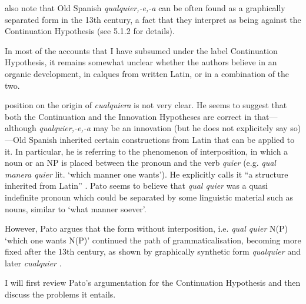 \documentclass[output=paper]{langscibook}
\begin{document}
also note that Old Spanish \textit{qualquier,-e,-a} can be often found as a graphically separated form in the 13th century, a fact that they interpret as being against the Continuation Hypothesis (see 5.1.2 for details). 

  In most of the accounts that I have subsumed under the label Continuation Hypothesis, it remains somewhat unclear whether the authors believe in an organic development, in calques from written Latin, or in a combination of the two.

   position on the origin of \textit{cualquiera} is not very clear. He seems to suggest that both the Continuation and the Innovation Hypotheses are correct in that—although \textit{qualquier,\nobreakdash-e,\nobreakdash-a} may be an innovation (but he does not explicitely say so)—Old Spanish inherited certain constructions from Latin that can be applied to it. In particular, he is referring to the phenomenon of interposition, in which a noun or an NP is placed between the pronoun and the verb \textit{quier} (e.g. \textit{qual manera quier} lit. ‘which manner one wants’). He explicitly calls it “a structure inherited from Latin” \citep[273]{Pato2012}. Pato seems to believe that \textit{qual quier} was a quasi indefinite pronoun which could be separated by some linguistic material such as nouns, similar to ‘what manner soever’.

  However, Pato argues that the form without interposition, i.e. \textit{qual quier} N(P) ‘which one wants N(P)’ continued the path of grammaticalisation, becoming more fixed after the 13th century, as shown by graphically synthetic form \textit{qualquier} and later \textit{cualquier} \citep[297]{Pato2012}.

  I will first review Pato’s argumentation for the Continuation Hypothesis and then discuss the problems it entails. 
\end{document}
